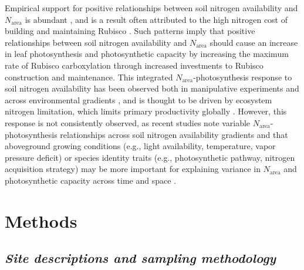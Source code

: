 Empirical support for positive relationships between soil nitrogen availability and $N_\mathrm{area}$ is abundant , and is a result often attributed to the high nitrogen cost of building and maintaining Rubisco . Such patterns imply that positive relationships between soil nitrogen availability and $N_\mathrm{area}$ should cause an increase in leaf photosynthesis and photosynthetic capacity by increasing the maximum rate of Rubisco carboxylation through increased investments to Rubisco construction and maintenance. This integrated $N_\mathrm{area}$-photosynthesis response to soil nitrogen availability has been observed both in manipulative experiments and across environmental gradients , and is thought to be driven by ecosystem nitrogen limitation, which limits primary productivity globally . However, this response is not consistently observed, as recent studies note variable $N_\mathrm{area}$-photosynthesis relationships across soil nitrogen availability gradients  and that aboveground growing conditions (e.g., light availability, temperature, vapor pressure deficit) or species identity traits (e.g., photosynthetic pathway, nitrogen acquisition strategy) may be more important for explaining variance in $N_\mathrm{area}$ and photosynthetic capacity across time and space .

\section{Methods}

\subsection{\textit{Site descriptions and sampling methodology}}

